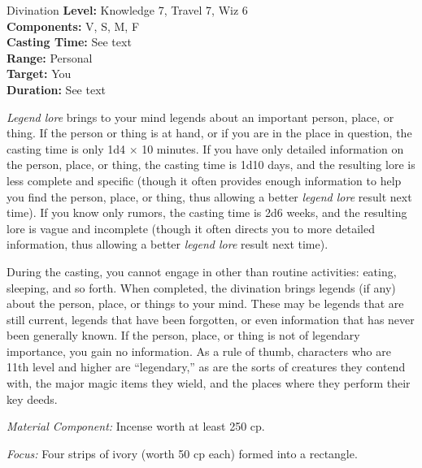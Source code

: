 {Divination}
{
	\textbf{Level:}
	Knowledge 7, Travel 7, Wiz 6\\
	\textbf{Components:}
	V, S, M, F\\
	\textbf{Casting Time:}
	See text\\
	\textbf{Range:}
	Personal\\
	\textbf{Target:}
	You\\
	\textbf{Duration:}
	See text\\
}
{
	\emph{Legend lore} brings to your mind legends about an important person, place, or thing. If the person or thing is at hand, or if you are in the place in question, the casting time is only 1d4 $\times$ 10 minutes. If you have only detailed information on the person, place, or thing, the casting time is 1d10 days, and the resulting lore is less complete and specific (though it often provides enough information to help you find the person, place, or thing, thus allowing a better \emph{legend lore} result next time). If you know only rumors, the casting time is 2d6 weeks, and the resulting lore is vague and incomplete (though it often directs you to more detailed information, thus allowing a better \emph{legend lore} result next time).

	During the casting, you cannot engage in other than routine activities: eating, sleeping, and so forth. When completed, the divination brings legends (if any) about the person, place, or things to your mind. These may be legends that are still current, legends that have been forgotten, or even information that has never been generally known. If the person, place, or thing is not of legendary importance, you gain no information. As a rule of thumb, characters who are 11th level and higher are ``legendary,'' as are the sorts of creatures they contend with, the major magic items they wield, and the places where they perform their key deeds.

	\textit{Material Component:}
	Incense worth at least 250 cp.

	\textit{Focus:}
	Four strips of ivory (worth 50 cp each) formed into a rectangle.

}
